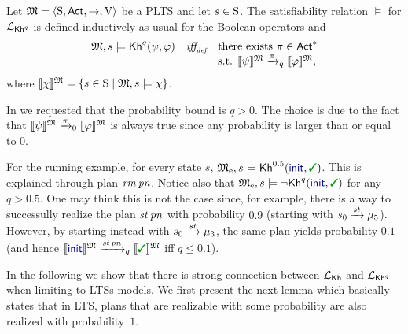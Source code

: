 \begin{definition}\label{def:semantics:PKh}
  Let $\model = \tup{\S,\Act,\ra,\V}$ be a PLTS and let $s\in\S$.  The
  satisfiability relation $\models$ for $\PKh$ is defined inductively 
  as usual for the Boolean operators and
  \[
  \begin{array}{l@{\ \ \ }c@{\ \ \  }l}
    \model, s \models \kh^q(\psi,\varphi) & \iffdef & \text{there exists } \plan \in \Act^*  \\
    & & \text{s.t. } \truthset{\model}{\psi} \reach{\plan}_q \truthset{\model}{\varphi}, 
  \end{array}
  \]
  where $\truthset{\model}{\chi} = \csetsc{s\in\S}{\model,s\models\chi}$.
\end{definition}

In  we requested that the probability bound is
${q>0}$.  The choice is due to the fact that $\truthset{\model}{\psi}
\reach{\plan}_0 \truthset{\model}{\varphi}$ is always true since any
probability is larger than or equal to $0$.

\begin{example}\label{ex:running:pkh}
  For the running example, for every state $s$,
  $\modelex, s \models \kh^{0.5}(\init,\goal)$.
  This is explained through plan $\ramp\,\panic$.
  Notice also that $\modelex, s \models \neg \kh^q(\init,\goal)$ for
  any $q>0.5$. One may think this is not the case since, for example,
  there is a way to successully realize the plan $\stairs\,\panic$
  with probability $0.9$ (starting with $s_0\reach{\stairs}\mu_5$).
  However, by starting instead with $s_0\reach{\stairs}\mu_3$, the
  same plan yields probability $0.1$ (and hence
  $\truthset{\model}{\init}\reach{\stairs\,\panic}_q\truthset{\model}{\goal}$
  iff $q\leq 0.1$).
\end{example}

In the following we show that there is strong connection between
$\Khlogic$ and $\PKh$ when limiting to LTSs models. We first present
the next lemma which basically states that in LTS, plans that are
realizable with some probability are also realized with
probability~$1$.

